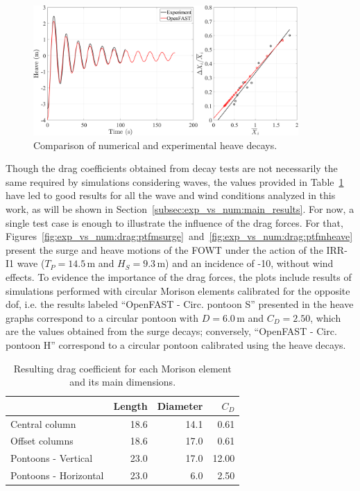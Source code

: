 \begin{figure}[!hbtp]
	\centering
	\includegraphics[width=0.9\textwidth]{./figures/heave_decay_drag_pontoon.png}%
	\caption{Comparison of numerical and experimental heave decays.} \label{fig:exp_vs_num:drag:heave_decay}%
\end{figure}%

Though the drag coefficients obtained from decay tests are not necessarily the same required by simulations considering waves, the values provided in Table~\ref{tab:exp_vs_num:drag:drag_coeffs} have led to good results for all the wave and wind conditions analyzed in this work, as will be shown in Section~\ref{subsec:exp_vs_num:main_results}. For now, a single test case is enough to illustrate the influence of the drag forces. For that, Figures~\ref{fig:exp_vs_num:drag:ptfmsurge}~and~\ref{fig:exp_vs_num:drag:ptfmheave} present the surge and heave motions of the FOWT under the action of the IRR-I1 wave ($T_P=14.5\,\text{m}$ and $H_S=9.3\,\text{m}$) and an incidence of -10\textdegree{}, without wind effects. To evidence the importance of the drag forces, the plots include results of simulations performed with circular Morison elements calibrated for the opposite dof, i.e. the results labeled \enquote{OpenFAST - Circ. pontoon S} presented in the heave graphs correspond to a circular pontoon with $D=6.0\,\text{m}$ and $C_D=2.50$, which are the values obtained from the surge decays; conversely, \enquote{OpenFAST - Circ. pontoon H} correspond to a circular pontoon calibrated using the heave decays.

\begin{table}[!hbtp]
	\caption{Resulting drag coefficient for each Morison element and its main dimensions.}\label{tab:exp_vs_num:drag:drag_coeffs}
	\begin{tabular}{lrrr}
		\toprule
		& Length & Diameter & $C_D$ \\
		\midrule
		Central column & 18.6 & 14.1 & 0.61 \\
		Offset columns & 18.6 & 17.0 & 0.61 \\
		Pontoons - Vertical & 23.0 & 17.0 & 12.00 \\
		Pontoons - Horizontal & 23.0 & 6.0 & 2.50 \\
		\bottomrule%
\end{tabular}%
\end{table}%


